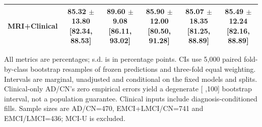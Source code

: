 \documentclass{article}
\providecommand{\DIFaddtex}[1]{{\protect\color{blue} \sf #1}} %
\providecommand{\DIFadd}[1]{\texorpdfstring{\DIFaddtex{#1}}{#1}} %
\begin{document}
\begin{landscape}
\begin{longtable}{lccccc}
MRI+Clinical & \shortstack{85.32 $\pm$ 13.80\\{}[82.34, 88.53]} & \shortstack{89.60 $\pm$ 9.08\\{}[86.11, 93.02]} & \shortstack{85.90 $\pm$ 12.00\\{}[80.50, 91.28]} & \shortstack{85.07 $\pm$ 18.35\\{}[81.25, 88.89]} & \shortstack{85.49 $\pm$ 12.24\\{}[82.16, 88.89]} \\
\midrule
\bottomrule
\end{longtable}
\noindent\footnotesize \DIFadd{All metrics are percentages; s.d. is in percentage points. CIs use 5,000 paired fold-by-class bootstrap resamples of frozen predictions and three-fold equal weighting. Intervals are marginal, unadjusted and conditional on the fixed models and splits. Clinical-only AD/CN's zero empirical errors yield a degenerate }[\DIFadd{100,100}] \DIFadd{bootstrap interval, not a population guarantee. Clinical inputs include diagnosis-conditioned fills. Sample sizes are AD/CN=470, EMCI+LMCI/CN=741 and EMCI/LMCI=436; MCI-U is excluded.
}\endgroup
\end{landscape}

\end{document}
